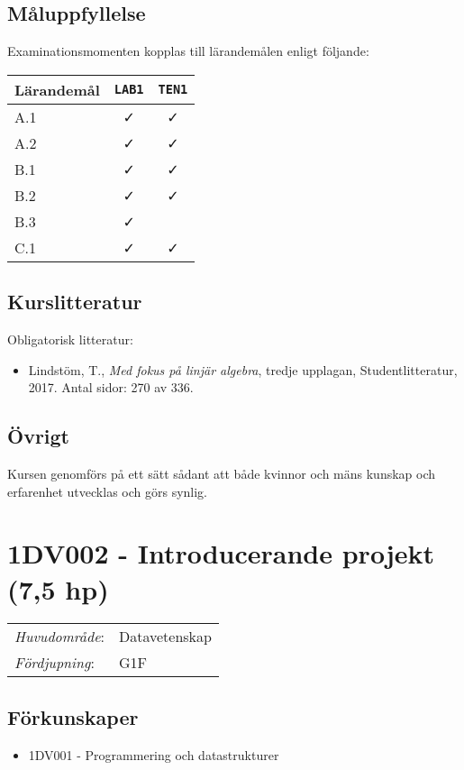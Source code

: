 \subsection*{Måluppfyllelse}

Examinationsmomenten kopplas till lärandemålen enligt följande:

\begin{longtable}[]{@{}lcc@{}}
\toprule
\textsf{Lärandemål} & \texttt{LAB1} & \texttt{TEN1}\tabularnewline
\midrule
\endhead
A.1 & \faCheck & \faCheck\tabularnewline
A.2 & \faCheck & \faCheck\tabularnewline
B.1 & \faCheck & \faCheck\tabularnewline
B.2 & \faCheck & \faCheck\tabularnewline
B.3 & \faCheck &\tabularnewline
C.1 & \faCheck & \faCheck\tabularnewline
\bottomrule
\end{longtable}

\subsection*{Kurslitteratur}

Obligatorisk litteratur:

\begin{itemize}
\tightlist
\item
  Lindstöm, T., \emph{Med fokus på linjär algebra}, tredje upplagan,
  Studentlitteratur, 2017. Antal sidor: 270 av 336.
\end{itemize}

\subsection*{Övrigt}

Kursen genomförs på ett sätt sådant att både kvinnor och mäns kunskap och erfarenhet utvecklas och görs synlig.
\pagebreak

\section*{1DV002 - Introducerande projekt (7,5 hp)}

\begin{tabular}{ll}\emph{Huvudområde}: & Datavetenskap\tabularnewline\emph{Fördjupning}: & G1F\tabularnewline\end{tabular}

\subsection*{Förkunskaper}

\begin{itemize}
\tightlist
\item
  1DV001 - Programmering och datastrukturer
\end{itemize}

